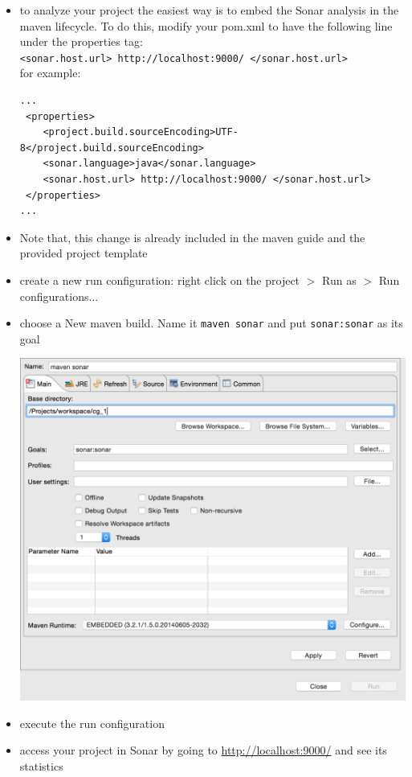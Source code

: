 \documentclass{article}
\newif\ifinstall
\begin{document}
\begin{itemize}
\ifinstall
\else
\item to analyze your project the easiest way is to embed the Sonar
  analysis in the maven lifecycle. To do this, modify your pom.xml to have the following line under
  the properties tag:\\
\texttt{<sonar.host.url> http://localhost:9000/ </sonar.host.url>}\\
for example:
\begin{lstlisting}
...
 <properties>
    <project.build.sourceEncoding>UTF-8</project.build.sourceEncoding>
    <sonar.language>java</sonar.language>
    <sonar.host.url> http://localhost:9000/ </sonar.host.url>
 </properties>
...
\end{lstlisting}
\item Note that, this change is already included in the maven guide and the provided project template
\item create a new run configuration: right click on the project $>$
  Run as $>$ Run configurations...
\item choose a New maven build. Name it \texttt{maven sonar} and put
  \texttt{sonar:sonar} as its goal
\begin{center}
\includegraphics[scale=0.5]{figures/ss5}
\end{center}
\item execute the run configuration
\item access your project in Sonar by going to
  \url{http://localhost:9000/} and see its statistics
\fi
\end{itemize}
\end{document}
